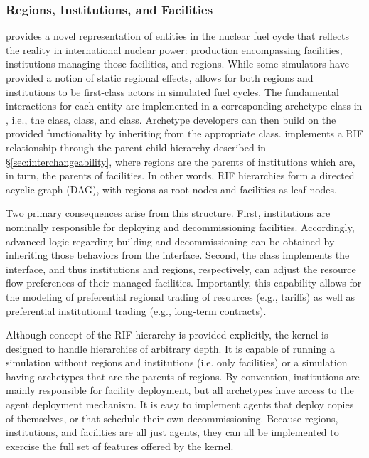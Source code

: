 \subsubsection{Regions, Institutions, and Facilities}

\Cyclus provides a novel representation of entities in the nuclear fuel cycle 
that reflects the reality in international nuclear power: production
encompassing facilities, institutions managing those facilities, and regions. While
some simulators \cite{andrianova_desae_2008} have provided a notion of static regional
effects, \Cyclus allows for both regions and institutions to be first-class
actors in simulated fuel cycles. The fundamental interactions for each entity are implemented in a corresponding
archetype class in \Cyclus, i.e., the  class, 
class, and  class. Archetype developers can then build on the
provided functionality by inheriting from the appropriate class.
\Cyclus implements a \gls{RIF} relationship through the
parent-child hierarchy described in \S \ref{sec:interchangeability}, where
regions are the parents of institutions which are, in turn, the parents of
facilities. In other words, \gls{RIF} hierarchies form a directed acyclic graph (DAG),
with regions as root nodes and facilities as leaf nodes.

Two primary consequences arise from this structure. First, institutions are
nominally
responsible for deploying and decommissioning facilities. Accordingly, advanced
logic regarding building and decommissioning can be obtained by inheriting 
those behaviors from the
 interface. Second, the  class implements the
 interface, and thus institutions and regions, respectively, can
adjust the resource flow preferences of their managed facilities. Importantly,
this capability allows for the modeling of preferential regional trading
of resources (e.g., tariffs) as well as preferential institutional trading
(e.g., long-term contracts).

Although concept of the \gls{RIF} hierarchy is provided explicitly, the \Cyclus kernel is
designed to handle hierarchies of arbitrary depth.  It is capable of 
running a simulation without regions and institutions (i.e.  only facilities)
or a simulation having archetypes that are the parents of regions.  By
convention, institutions are mainly responsible for facility deployment, but
all archetypes have access to the agent deployment mechanism.  It is easy
to implement agents that deploy copies of themselves, or that schedule their
own decommissioning.  Because regions, institutions, and facilities are all
just agents, they can all be implemented to exercise the full set of features
offered by the \Cyclus kernel.

